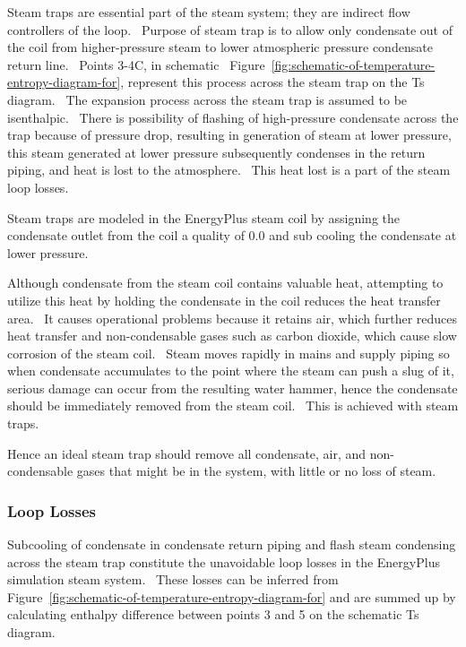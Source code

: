 Steam traps are essential part of the steam system; they are indirect flow controllers of the loop.~ Purpose of steam trap is to allow only condensate out of the coil from higher-pressure steam to lower atmospheric pressure condensate return line.~ Points 3-4C, in schematic~ Figure~\ref{fig:schematic-of-temperature-entropy-diagram-for}, represent this process across the steam trap on the Ts diagram.~ The expansion process across the steam trap is assumed to be isenthalpic.~ There is possibility of flashing of high-pressure condensate across the trap because of pressure drop, resulting in generation of steam at lower pressure, this steam generated at lower pressure subsequently condenses in the return piping, and heat is lost to the atmosphere.~ This heat lost is a part of the steam loop losses.

Steam traps are modeled in the EnergyPlus steam coil by assigning the condensate outlet from the coil a quality of 0.0 and sub cooling the condensate at lower pressure.

Although condensate from the steam coil contains valuable heat, attempting to utilize this heat by holding the condensate in the coil reduces the heat transfer area.~ It causes operational problems because it retains air, which further reduces heat transfer and non-condensable gases such as carbon dioxide, which cause slow corrosion of the steam coil.~ Steam moves rapidly in mains and supply piping so when condensate accumulates to the point where the steam can push a slug of it, serious damage can occur from the resulting water hammer, hence the condensate should be immediately removed from the steam coil.~ This is achieved with steam traps.

Hence an ideal steam trap should remove all condensate, air, and non-condensable gases that might be in the system, with little or no loss of steam.

\subsubsection{Loop Losses}\label{loop-losses}

Subcooling of condensate in condensate return piping and flash steam condensing across the steam trap constitute the unavoidable loop losses in the EnergyPlus simulation steam system.~ These losses can be inferred from Figure~\ref{fig:schematic-of-temperature-entropy-diagram-for} and are summed up by calculating enthalpy difference between points 3 and 5 on the schematic Ts diagram.

